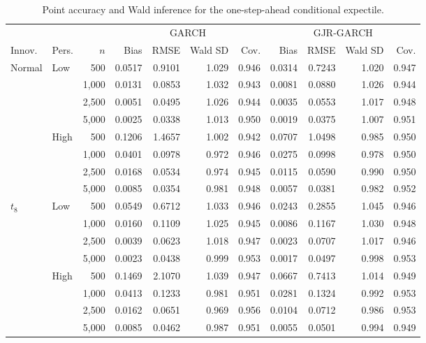 \begin{table}[!p]
\centering
\caption{Point accuracy and Wald inference for the one-step-ahead conditional expectile.}
\label{tab:mc-ce-wald-portrait}
\footnotesize
\setlength{\tabcolsep}{3.0pt}
\renewcommand{\arraystretch}{1.02}
\begin{tabular}{llr*{8}{r}}
\toprule
&&&\multicolumn{4}{c}{GARCH}&\multicolumn{4}{c}{GJR-GARCH}\\
\cmidrule(lr){4-7}\cmidrule(lr){8-11}
Innov. & Pers. & $n$ & Bias & RMSE & Wald SD & Cov. & Bias & RMSE & Wald SD & Cov.\\
\midrule
Normal & Low & 500 & 0.0517 & 0.9101 & 1.029 & 0.946 & 0.0314 & 0.7243 & 1.020 & 0.947\\
 &  & 1,000 & 0.0131 & 0.0853 & 1.032 & 0.943 & 0.0081 & 0.0880 & 1.026 & 0.944\\
 &  & 2,500 & 0.0051 & 0.0495 & 1.026 & 0.944 & 0.0035 & 0.0553 & 1.017 & 0.948\\
 &  & 5,000 & 0.0025 & 0.0338 & 1.013 & 0.950 & 0.0019 & 0.0375 & 1.007 & 0.951\\
\addlinespace[1pt]
 & High & 500 & 0.1206 & 1.4657 & 1.002 & 0.942 & 0.0707 & 1.0498 & 0.985 & 0.950\\
 &  & 1,000 & 0.0401 & 0.0978 & 0.972 & 0.946 & 0.0275 & 0.0998 & 0.978 & 0.950\\
 &  & 2,500 & 0.0168 & 0.0534 & 0.974 & 0.945 & 0.0115 & 0.0590 & 0.990 & 0.950\\
 &  & 5,000 & 0.0085 & 0.0354 & 0.981 & 0.948 & 0.0057 & 0.0381 & 0.982 & 0.952\\
\addlinespace[3pt]
$t_8$ & Low & 500 & 0.0549 & 0.6712 & 1.033 & 0.946 & 0.0243 & 0.2855 & 1.045 & 0.946\\
 &  & 1,000 & 0.0160 & 0.1109 & 1.025 & 0.945 & 0.0086 & 0.1167 & 1.030 & 0.948\\
 &  & 2,500 & 0.0039 & 0.0623 & 1.018 & 0.947 & 0.0023 & 0.0707 & 1.017 & 0.946\\
 &  & 5,000 & 0.0023 & 0.0438 & 0.999 & 0.953 & 0.0017 & 0.0497 & 0.998 & 0.953\\
\addlinespace[1pt]
 & High & 500 & 0.1469 & 2.1070 & 1.039 & 0.947 & 0.0667 & 0.7413 & 1.014 & 0.949\\
 &  & 1,000 & 0.0413 & 0.1233 & 0.981 & 0.951 & 0.0281 & 0.1324 & 0.992 & 0.953\\
 &  & 2,500 & 0.0162 & 0.0651 & 0.969 & 0.956 & 0.0104 & 0.0712 & 0.986 & 0.953\\
 &  & 5,000 & 0.0085 & 0.0462 & 0.987 & 0.951 & 0.0055 & 0.0501 & 0.994 & 0.949\\

\end{tabular}
\end{table}
